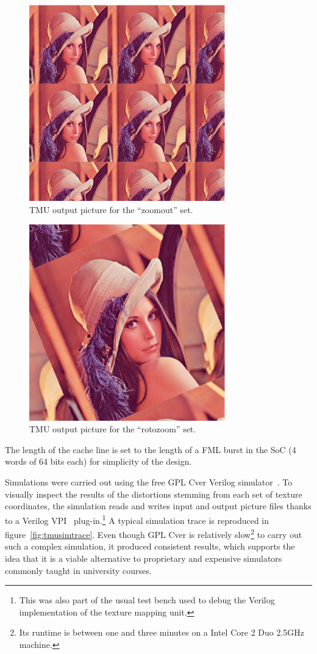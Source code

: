 \documentclass[a4paper,11pt]{kthesis}
\begin{document}
\begin{figure}[htp]
\centering
\includegraphics[height=85mm]{tmuout_zoomout.eps}
\caption{TMU output picture for the ``zoomout'' set.}
\label{fig:tmuoutzoomout}
\end{figure}

\begin{figure}[htp]
\centering
\includegraphics[height=85mm]{tmuout_rotozoom.eps}
\caption{TMU output picture for the ``rotozoom'' set.}
\label{fig:tmuoutrotozoom}
\end{figure}

The length of the cache line is set to the length of a FML burst in the SoC (4 words of 64 bits each) for simplicity of the design.

Simulations were carried out using the free GPL Cver Verilog simulator~\cite{gplcver}. To visually inspect the results of the distortions stemming from each set of texture coordinates, the simulation reads and writes input and output picture files thanks to a Verilog VPI~\cite{vpi} plug-in.\footnote{This was also part of the usual test bench used to debug the Verilog implementation of the texture mapping unit.} A typical simulation trace is reproduced in figure~\ref{fig:tmusimtrace}. Even though GPL Cver is relatively slow\footnote{Its runtime is between one and three minutes on a Intel Core 2 Duo 2.5GHz machine.} to carry out such a complex simulation, it produced consistent results, which supports the idea that it is a viable alternative to proprietary and expensive simulators commonly taught in university courses.
\end{document}
